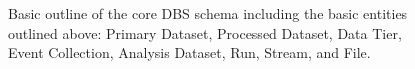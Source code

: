 \begin{figure}[hbtp]
  \begin{center}
    \caption{Basic outline of the core DBS schema including the basic 
             entities outlined above: Primary Dataset, Processed Dataset, 
             Data Tier, Event Collection, Analysis Dataset, Run, Stream, and 
             File.} 
    \label{fig:highlevel}
  \end{center}
\end{figure}




